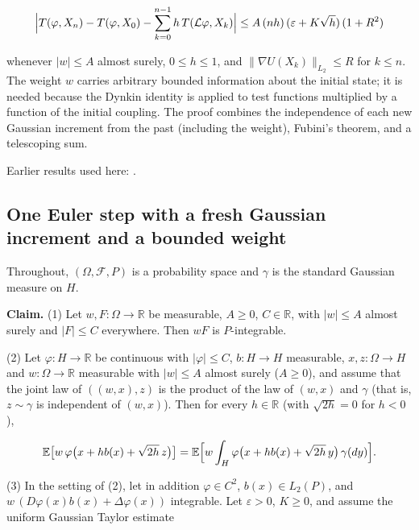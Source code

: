 \documentclass[11pt,a4paper]{report}
\begin{document}
\[\Bigl|T(\varphi,X_n)-T(\varphi,X_0)-\sum_{k=0}^{n-1}h\,T(\mathcal L\varphi,X_k)\Bigr|\le A\,(nh)\,(\varepsilon+K\sqrt h)\,(1+R^2)\]


whenever \(|w|\le A\) almost surely, \(0\le h\le1\), and \(\|\nabla U(X_k)\|_{L_2}\le R\) for \(k\le n\). The weight \(w\) carries arbitrary bounded information about the initial state; it is needed because the Dynkin identity is applied to test functions multiplied by a function of the initial coupling. The proof combines the independence of each new Gaussian increment from the past (including the weight), Fubini's theorem, and a telescoping sum.



Earlier results used here: \cite[Section~3.42]{LangevinLean2026ULASC}.
\subsection{\texorpdfstring{One Euler step with a fresh Gaussian increment and a bounded weight}{One Euler step with a fresh Gaussian increment and a bounded weight}}
\label{report-step-AverageLMC-LaplacianWeakChain-lean-1}


Throughout, \((\Omega,\mathcal F,P)\) is a probability space and \(\gamma\) is the standard Gaussian measure on \(H\).




\textbf{Claim.} (1) Let \(w,F:\Omega\to\mathbb R\) be measurable, \(A\ge0\), \(C\in\mathbb R\), with \(|w|\le A\) almost surely and \(|F|\le C\) everywhere. Then \(wF\) is \(P\)-integrable.




(2) Let \(\varphi:H\to\mathbb R\) be continuous with \(|\varphi|\le C\), \(b:H\to H\) measurable, \(x,z:\Omega\to H\) and \(w:\Omega\to\mathbb R\) measurable with \(|w|\le A\) almost surely (\(A\ge0\)), and assume that the joint law of \(((w,x),z)\) is the product of the law of \((w,x)\) and \(\gamma\) (that is, \(z\sim\gamma\) is independent of \((w,x)\)). Then for every \(h\in\mathbb R\) (with \(\sqrt{2h}=0\) for \(h<0\)),


\[\mathbb E\bigl[w\,\varphi\bigl(x+hb(x)+\sqrt{2h}\,z\bigr)\bigr]=\mathbb E\Bigl[w\int_H\varphi\bigl(x+hb(x)+\sqrt{2h}\,y\bigr)\,\gamma(dy)\Bigr].\]


(3) In the setting of (2), let in addition \(\varphi\in C^2\), \(b(x)\in L_2(P)\), and \(w\,(D\varphi(x)b(x)+\Delta\varphi(x))\) integrable. Let \(\varepsilon>0\), \(K\ge0\), and assume the uniform Gaussian Taylor estimate
\end{document}
